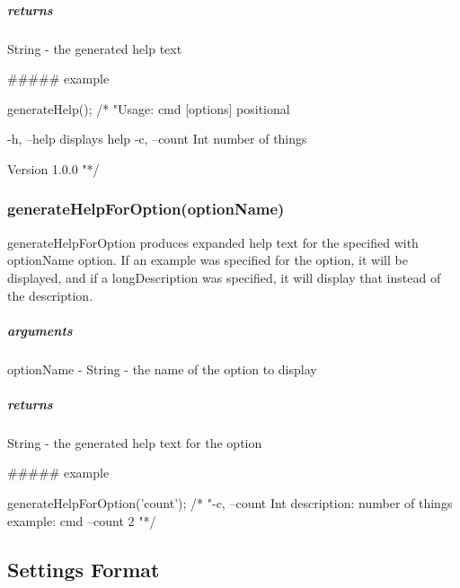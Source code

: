 \subparagraph*{returns}

{\ttfamily String} -\/ the generated help text

\#\#\#\#\# example 
\begin{DoxyCode}
generateHelp(); /*
"Usage: cmd [options] positional

  -h, --help       displays help
  -c, --count Int  number of things

Version  1.0.0
"*/
\end{DoxyCode}


\subsubsection*{generate\+Help\+For\+Option(option\+Name)}

{\ttfamily generate\+Help\+For\+Option} produces expanded help text for the specified with {\ttfamily option\+Name} option. If an {\ttfamily example} was specified for the option, it will be displayed, and if a {\ttfamily long\+Description} was specified, it will display that instead of the {\ttfamily description}.

\subparagraph*{arguments}


\begin{DoxyItemize}
\item option\+Name -\/ {\ttfamily String} -\/ the name of the option to display
\end{DoxyItemize}

\subparagraph*{returns}

{\ttfamily String} -\/ the generated help text for the option

\#\#\#\#\# example 
\begin{DoxyCode}
generateHelpForOption('count'); /*
"-c, --count Int
description: number of things
example: cmd --count 2
"*/
\end{DoxyCode}


\subsection*{Settings Format}

